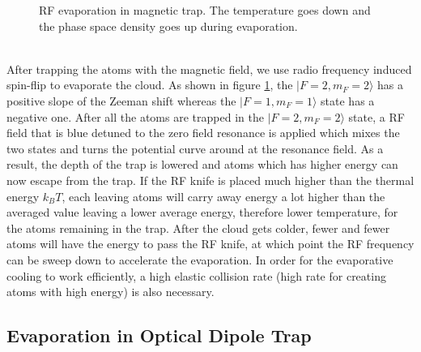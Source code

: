 \begin{figure}
\begin{center}
{
    }
  \end{center}
  \caption{RF evaporation in magnetic trap. The temperature goes down and the phase space density goes up during evaporation.}
  \label{mt:evap}
\end{figure}\\
After trapping the atoms with the magnetic field, we use radio frequency induced spin-flip to evaporate the cloud. As shown in figure \ref{mt:evap}, the $|F=2, m_F=2\rangle$ has a positive slope of the Zeeman shift whereas the $|F=1, m_F=1\rangle$ state has a negative one. After all the atoms are trapped in the $|F=2, m_F=2\rangle$ state, a RF field that is blue detuned to the zero field resonance is applied which mixes the two states and turns the potential curve around at the resonance field. As a result, the depth of the trap is lowered and atoms which has higher energy can now escape from the trap. If the RF knife is placed much higher than the thermal energy $k_BT$, each leaving atoms will carry away energy a lot higher than the averaged value leaving a lower average energy, therefore lower temperature, for the atoms remaining in the trap. After the cloud gets colder, fewer and fewer atoms will have the energy to pass the RF knife, at which point the RF frequency can be sweep down to accelerate the evaporation. In order for the evaporative cooling to work efficiently, a high elastic collision rate (high rate for creating atoms with high energy) is also necessary.

\subsection{Evaporation in Optical Dipole Trap}\label{theory:odt}

